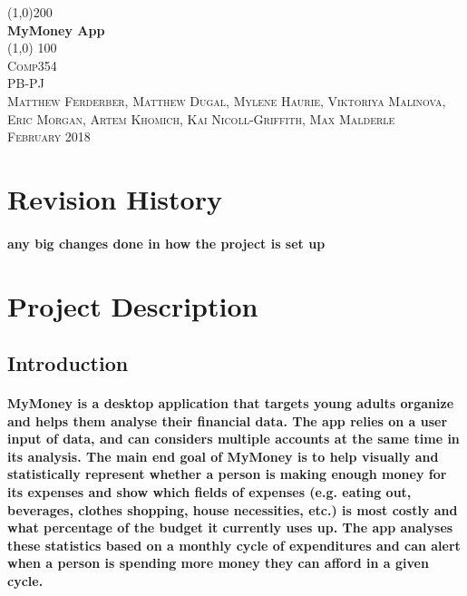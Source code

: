 \documentclass{article}
\begin{document}
\begin {titlepage}
    \begin{center}
   \line(1,0){200} \\
    \huge{\bfseries MyMoney App}\\
    \line (1,0) {100} \\
    [1.5cm]
    \textsc{\LARGE Comp354}\\
    [1cm]
    \textsc{\large PB-PJ}\\
    [3 cm]
    \textsc{\large Matthew Ferderber, Matthew Dugal, Mylene Haurie, Viktoriya Malinova, Eric Morgan, Artem Khomich, \break Kai Nicoll-Griffith, Max Malderle }\\
    [6cm]
    \textsc{\large February 2018}\\

    \end{center}
\end{titlepage}

\fontsize{11pt}{13pt}\selectfont
\setlength{\parindent}{13 pt}

\newpage
 \section {Revision History}
 \paragraph{\indent any big changes done in how the project is set up}
 
\newpage
\tableofcontents

\newpage
\section {Project Description}


\subsection{Introduction}
\paragraph{\indent MyMoney is a desktop application that targets young adults organize and helps them analyse their financial data. The app relies on a user input of data, and can considers multiple accounts at the same time in its analysis. The main end goal of MyMoney is to help visually and statistically represent whether a person is making enough money for its expenses and show which fields of expenses (e.g. eating out, beverages, clothes shopping, house necessities, etc.) is most costly and what percentage of the budget it currently uses up. The app analyses these statistics based on a monthly cycle of expenditures and can alert when a person is spending more money they can afford in a given cycle. }
\end{document}
